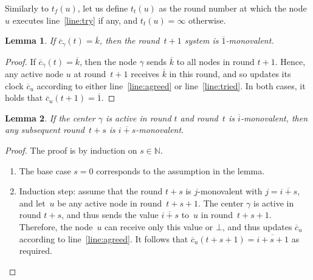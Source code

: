 \documentclass{article}
\newtheorem{lemma}{Lemma}[section]
\newcommand{\cent}{\gamma}
\newcommand{\IN}{\mathds{N}}
\newcommand{\tf}{t_{f}}
\newcommand{\try}{t_{t}}
\begin{document}
Similarly to $\tf (u)$, let us define $\try (u)$  as the round number at which the node~$u$ executes line~\ref{line:try} 
	if any, and $\try (u)= \infty$ otherwise.

\begin{lemma}\label{lem:k_mono}
If $\overline{c}_\cent(t) = \overline{k} $, then the round~$t +1$ system is $\overline{1}$-monovalent.
\end{lemma}

\begin{proof}
If $\overline{c}_\cent(t) = \overline{k} $, then the node $\cent$ sends $\overline{k}$ to all nodes in round $t+1$.
Hence, any active node $u$ at round~$t+1$ receives $\overline{k}$ in this round,
	and so updates its clock $\overline{c}_u$ according to either line~\ref{line:agreed} or line~\ref{line:tried}.
In both cases, it holds that $\overline{c}_u (t+1) =\overline{1}$.
\end{proof}

\begin{lemma}\label{lem:mono_mono}
	If the center $\cent$ is active in round $t$  and round~$t$ is $\overline{i}$-monovalent, 
	then any subsequent round~$ t + s$ is $\overline{i+ s}$-monovalent.
\end{lemma}

\begin{proof}
The proof is by induction on $s \in \IN$.
\begin{enumerate}
		\item The base case $s=0$ corresponds to the assumption in the lemma.
		\item Induction step:  assume that the round $t+s$ is $j$-monovalent with $j = \overline{i+s} $,
			 and let~$u$ be  any active node in round~$t+s+1$.
			The center $\cent$ is active in round $t +s$, and thus sends the value $\overline{i+s}$ to~$u$
				in round~$ t+s+1$.
			Therefore, the node~$u$ can receive only this value or $\bot$, and thus updates
				$\overline{c}_u$ according to line~\ref{line:agreed}. 
			It follows that $ \overline{c}_u(t+s+1) = \overline{i+s +1}$ as required.
\end{enumerate}
\end{proof}
\end{document}
